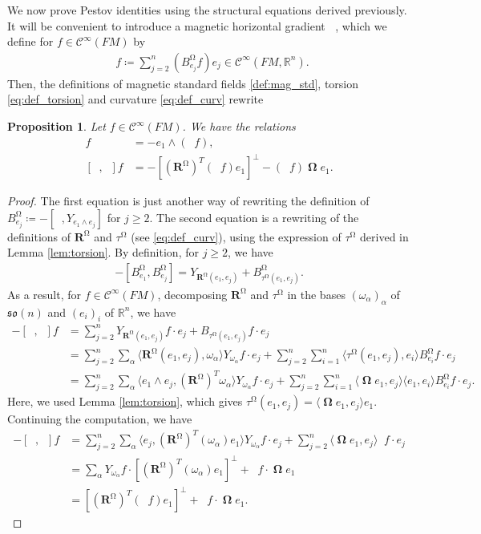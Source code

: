 \documentclass[12pt]{amsart}
\numberwithin{numbering}{section}
\theoremstyle{plain}
\newtheorem{pps}[numbering]{Proposition}
\theoremstyle{definition}
\theoremstyle{remark}
\numberwithin{equation}{section}
\DeclareMathOperator{\nv}{\nabla_{\mathbb{V}}}
\DeclareMathOperator{\nhs}{\nabla_{\mathbb{H}^{\mg}}}
\DeclareMathOperator{\xs}{\mathbb{X}^{\mg}}
\DeclareMathOperator{\oo}{\mathbf{\Omega}}
\DeclareMathOperator{\mg}{\Omega}
\newcommand{\rsfm}{\mathbf{R}^{\mg}}
\newcommand{\R}{\mathbb{R}}
\newcommand{\frk}[1]{\mathfrak{#1}}
\begin{document}
We now prove Pestov identities using the structural equations derived previously. It will be convenient to introduce a magnetic horizontal gradient $\nhs$, which we define for $f \in \mathcal{C}^\infty(FM)$ by 
\begin{align}
\nhs f \coloneq \sum_{j=2}^n (B_{e_j}^{\mg} f) e_j \in \mathcal{C}^\infty(FM, \R^n).
\end{align}
Then, the definitions of magnetic standard fields \ref{def:mag_std}, torsion \eqref{eq:def_torsion} and curvature \eqref{eq:def_curv} rewrite
\begin{pps} Let $f \in \mathcal{C}^\infty(FM)$. We have the relations
\begin{align}
[\xs, \nv]f &= - e_1 \wedge (\nhs f), \label{eq:struct_mag1}\\ 
[\xs, \nhs] f &= - [(\rsfm)^T(\nv f) e_1]^\perp - (\xs f) \oo e_1. \label{eq:struct_mag2}
\end{align}
\end{pps}

\begin{proof}
The first equation is just another way of rewriting the definition of $B_{e_j}^{\mg} \coloneq - [\xs, Y_{e_1 \wedge e_j}]$ for $j \geq 2$. The second equation is a rewriting of the definitions of $\rsfm$ and $\tau^{\mg}$
(see \eqref{eq:def_curv}), using the expression of $\tau^{\mg}$ derived in Lemma \ref{lem:torsion}. By definition, for $j \geq 2$, we have
\begin{align*}
- [B_{e_1}^{\mg}, B_{e_j}^{\mg}] = Y_{\rsfm(e_1, e_j)} + B_{\tau^{\mg}(e_1, e_j)}^{\mg}.
\end{align*}
As a result, for $f \in \mathcal{C}^{\infty}(FM)$, decomposing $\rsfm$ and $\tau^{\mg}$ in the bases $(\omega_\alpha)_\alpha$ of $\frk{so}(n)$ and $(e_i)_i$ of $\R^n$, we have
\begin{align*}
- [\xs, \nhs] f
&= \sum_{j=2}^n Y_{\rsfm(e_1, e_j)} f \cdot e_j + B_{\tau^{\mg}(e_1, e_j)} f \cdot e_j \\ 
&= \sum_{j=2}^n \sum_{\alpha} \langle \rsfm(e_1, e_j), \omega_\alpha \rangle Y_{\omega_\alpha} f \cdot e_j + \sum_{j=2}^n \sum_{i=1}^n \langle \tau^{\mg}(e_1, e_j), e_i \rangle B_{e_i}^{\mg} f \cdot e_j \\ 
&= \sum_{j=2}^n \sum_{\alpha} \langle e_1 \wedge e_j, (\rsfm)^T \omega_\alpha \rangle Y_{\omega_\alpha} f \cdot e_j + \sum_{j=2}^n \sum_{i=1}^n \langle \oo e_1, e_j \rangle \langle e_1, e_i \rangle B_{e_i}^{\mg} f \cdot e_j.
\end{align*} 
Here, we used Lemma \ref{lem:torsion}, which  gives $\tau^{\mg}(e_1, e_j) = \langle \oo e_1, e_j \rangle e_1$. Continuing the computation, we have
\begin{align*} 
- [\xs, \nhs] f &= \sum_{j=2}^n \sum_{\alpha} \langle e_j, (\rsfm)^T (\omega_\alpha) e_1 \rangle Y_{\omega_\alpha} f \cdot e_j + \sum_{j=2}^n \langle \oo e_1, e_j \rangle \xs f \cdot e_j \\ 
&= \sum_{\alpha} Y_{\omega_\alpha} f \cdot [(\rsfm)^T (\omega_\alpha) e_1]^\perp + \xs f \cdot \oo e_1 \\ 
&= [(\rsfm)^T (\nv f) e_1]^\perp + \xs f \cdot \oo e_1.
\end{align*}

\end{proof}
\end{document}
